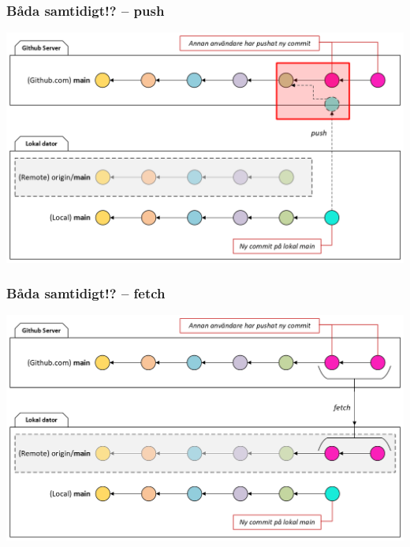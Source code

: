 \begin{frame}
    \frametitle{Båda samtidigt!? -- push}

    \begin{center}
        \includegraphics[width=\textwidth]{figs/local_remote_push_conflict.png}
    \end{center}

\end{frame}

\begin{frame}
    \frametitle{Båda samtidigt!? -- fetch}

    \begin{center}
        \includegraphics[width=\textwidth]{figs/local_remote_fetch_conflict.png}
    \end{center}

\end{frame}

